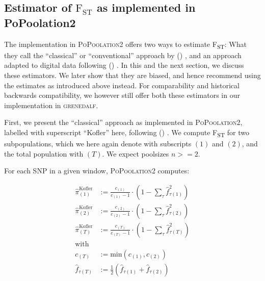 \documentclass[letterpaper,fontsize=9pt,DIV=12]{scrartcl}
\newcounter{todo}
\newcommand\todo[1]{}
\newcommand\citeay[1]{\citeauthor{#1} (\citeyear{#1}) \cite{#1}}
\newcommand\toolname{\textsc}
\newcommand\secref[1]{Section~\ref{#1}}
\newcommand{\coverage}{c}
\newcommand{\empfreq}{\widehat{f}}
\newcommand{\fst}{F\textsubscript{ST}}
\begin{document}

\subsection{Estimator of \texorpdfstring{$\text{F}_\text{ST}$}{FST} as implemented in PoPoolation2}
\label{supp:sec:FST:sub:PoPoolation2Estimator}

The implementation in \toolname{PoPoolation2} \cite{Kofler2011b} offers two ways to estimate \fst{}:
What they call the ``classical'' or ``conventional'' approach by \citeay{Hartl2007}, and an approach adapted to digital data following \citeay{Karlsson2007}.
In this and the next section, we discuss these estimators.
We later show that they are biased, and hence recommend using the estimates as introduced above instead.
For comparability and historical backwards compatibility, we however still offer both these estimators in our implementation in \toolname{grenedalf}.


First, we present the ``classical'' approach as implemented in \toolname{PoPoolation2}, labelled with superscript ``Kofler'' here, following \citeay{Kofler2011b}.
We compute \fst{} for two subpopulations, which we here again denote with subscripts $(1)$ and $(2)$, and the total population with $(T)$. We expect poolsizes $n >= 2$.

For each SNP in a given window, \toolname{PoPoolation2} computes:

\begin{align}
    \label{eq:PoPoolation2FstPi:1}
    \widehat{\pi}_{(1)}^\text{Kofler}  &:= \frac{\coverage_{(1)}}{\coverage_{(1)}-1} \cdot  \left( 1 - \sum_\tau \empfreq_{\tau(1)}^2 \right) \\
    \label{eq:PoPoolation2FstPi:2}
    \widehat{\pi}_{(2)}^\text{Kofler}  &:= \frac{\coverage_{(2)}}{\coverage_{(2)}-1} \cdot  \left( 1 - \sum_\tau \empfreq_{\tau(2)}^2 \right) \\
    \label{eq:PoPoolation2FstPi:T}
    \widehat{\pi}_{(T)}^\text{Kofler}  &:= \frac{\coverage_{(T)}}{\coverage_{(T)}-1} \cdot  \left( 1 - \sum_\tau \empfreq_{\tau(T)}^2 \right) \\
    \nonumber
    \mbox{with} \\
    \nonumber
    \coverage_{(T)} &:= \mbox{min} \left( \coverage_{(1)}, \coverage_{(2)} \right) \\
    \nonumber
    \empfreq_{\tau(T)} &:= \frac{1}{2} \left( \empfreq_{\tau(1)} + \empfreq_{\tau(2)} \right)
\end{align}
\end{document}
